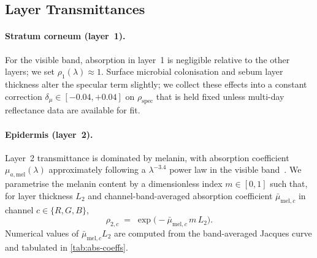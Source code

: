 \documentclass[10pt,twocolumn,a4paper]{article}
\theoremstyle{definition}
\newcommand{\melan}{m}
\begin{document}
\subsection{Layer Transmittances}

\paragraph{Stratum corneum (layer~1).} For the visible band, absorption
in layer~1 is negligible relative to the other layers; we set
$\rho_{1}(\lambda)\approx 1$. Surface microbial colonisation and
sebum layer thickness alter the specular term slightly; we collect
these effects into a constant correction
$\delta_{\mu}\in[-0.04,+0.04]$ on $\rho_{\mathrm{spec}}$ that is held
fixed unless multi-day reflectance data are available for fit.

\paragraph{Epidermis (layer~2).} Layer~2 transmittance is dominated by
melanin, with absorption coefficient
$\mu_{a,\mathrm{mel}}(\lambda)$ approximately following a
$\lambda^{-3.4}$ power law in the visible
band~\cite{jacques1998melanin}. We parametrise the melanin content by
a dimensionless index $\melan\in[0,1]$ such that, for layer thickness
$L_{2}$ and channel-band-averaged absorption coefficient
$\bar{\mu}_{\mathrm{mel},c}$ in channel $c\in\{R,G,B\}$,
\begin{equation}
    \rho_{2,c}
    \;=\; \exp\bigl(-\bar{\mu}_{\mathrm{mel},c}\, \melan\, L_{2}\bigr).
    \label{eq:rho2}
\end{equation}
Numerical values of $\bar{\mu}_{\mathrm{mel},c} L_{2}$ are computed
from the band-averaged Jacques curve and tabulated in
\cref{tab:abs-coeffs}.
\end{document}
